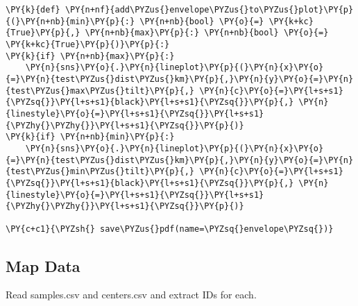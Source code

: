 \begin{tcolorbox}[breakable, size=fbox, boxrule=1pt, pad at break*=1mm,colback=cellbackground, colframe=cellborder]
\begin{Verbatim}[commandchars=\\\{\}]
\PY{k}{def} \PY{n+nf}{add\PYZus{}envelope\PYZus{}to\PYZus{}plot}\PY{p}{(}\PY{n+nb}{min}\PY{p}{:} \PY{n+nb}{bool} \PY{o}{=} \PY{k+kc}{True}\PY{p}{,} \PY{n+nb}{max}\PY{p}{:} \PY{n+nb}{bool} \PY{o}{=} \PY{k+kc}{True}\PY{p}{)}\PY{p}{:}
\PY{k}{if} \PY{n+nb}{max}\PY{p}{:}
    \PY{n}{sns}\PY{o}{.}\PY{n}{lineplot}\PY{p}{(}\PY{n}{x}\PY{o}{=}\PY{n}{test\PYZus{}dist\PYZus{}km}\PY{p}{,}\PY{n}{y}\PY{o}{=}\PY{n}{test\PYZus{}max\PYZus{}tilt}\PY{p}{,} \PY{n}{c}\PY{o}{=}\PY{l+s+s1}{\PYZsq{}}\PY{l+s+s1}{black}\PY{l+s+s1}{\PYZsq{}}\PY{p}{,} \PY{n}{linestyle}\PY{o}{=}\PY{l+s+s1}{\PYZsq{}}\PY{l+s+s1}{\PYZhy{}\PYZhy{}}\PY{l+s+s1}{\PYZsq{}}\PY{p}{)}
\PY{k}{if} \PY{n+nb}{min}\PY{p}{:}
    \PY{n}{sns}\PY{o}{.}\PY{n}{lineplot}\PY{p}{(}\PY{n}{x}\PY{o}{=}\PY{n}{test\PYZus{}dist\PYZus{}km}\PY{p}{,}\PY{n}{y}\PY{o}{=}\PY{n}{test\PYZus{}min\PYZus{}tilt}\PY{p}{,} \PY{n}{c}\PY{o}{=}\PY{l+s+s1}{\PYZsq{}}\PY{l+s+s1}{black}\PY{l+s+s1}{\PYZsq{}}\PY{p}{,} \PY{n}{linestyle}\PY{o}{=}\PY{l+s+s1}{\PYZsq{}}\PY{l+s+s1}{\PYZhy{}\PYZhy{}}\PY{l+s+s1}{\PYZsq{}}\PY{p}{)}

\PY{c+c1}{\PYZsh{} save\PYZus{}pdf(name=\PYZsq{}envelope\PYZsq{})}
\end{Verbatim}
\end{tcolorbox}

\hypertarget{map-data}{%
\subsection{Map Data}\label{map-data}}

Read samples.csv and centers.csv and extract IDs for each.

